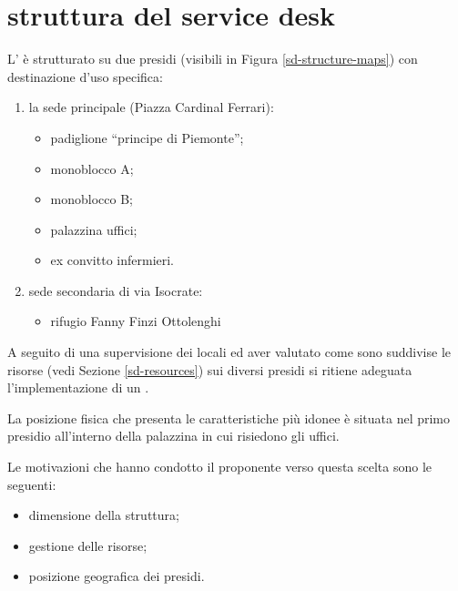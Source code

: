 %
%
\section[Struttura del Service Desk]{struttura del service desk}
\label{sd-structure}
L'\entity{} è strutturato su due presidi (visibili in Figura \ref{sd-structure-maps}) con destinazione d'uso specifica:

\begin{enumerate}
\item{la sede principale (Piazza Cardinal Ferrari):}
\begin{itemize}
\item{padiglione ``principe di Piemonte'';}
\item{monoblocco A;}
\item{monoblocco B;}
\item{palazzina uffici;}
\item{ex convitto infermieri.}
\end{itemize}
\item{sede secondaria di via Isocrate:}
\begin{itemize}
\item{rifugio Fanny Finzi Ottolenghi}
\end{itemize}
\end{enumerate}

A seguito di una supervisione dei locali ed aver valutato come sono suddivise le risorse (vedi Sezione \ref{sd-resources}) sui diversi presidi si ritiene adeguata l'implementazione di un .

La posizione fisica che presenta le caratteristiche più idonee è situata nel primo presidio all'interno della palazzina in cui risiedono gli uffici.

Le motivazioni che hanno condotto il proponente verso questa scelta sono le seguenti:

\begin{itemize}
\item{dimensione della struttura;}
\item{gestione delle risorse;}
\item{posizione geografica dei presidi.}
\end{itemize}

